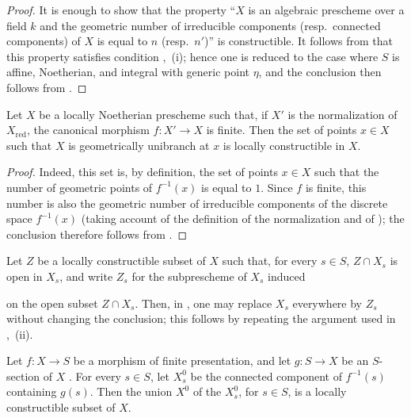 \begin{proof}
It is enough to show that the property ``$X$ is an algebraic prescheme over a field $k$ and the geometric number of irreducible components (resp.\ connected components) of $X$ is equal to $n$ (resp.\ $n'$)'' is constructible. It follows from  that this property satisfies condition ,~(i); hence one is reduced to the case where $S$ is affine, Noetherian, and integral with generic point $\eta$, and the conclusion then follows from .
\end{proof}

\begin{corollary}[9.7.10]
\label{IV.9.7.10}
Let $X$ be a locally Noetherian prescheme such that, if $X'$ is the normalization of $X_{\mathrm{red}}$, the canonical morphism $f:X'\to X$ is finite. Then the set of points $x\in X$ such that $X$ is geometrically unibranch at $x$ is locally constructible in $X$.
\end{corollary}

\begin{proof}
Indeed, this set is, by definition, the set of points $x\in X$ such that the number of geometric points of $f^{-1}(x)$ is equal to $1$. Since $f$ is finite, this number is also the geometric number of irreducible components of the discrete space $f^{-1}(x)$ (taking account of the definition of the normalization  and of ); the conclusion therefore follows from .
\end{proof}

\begin{remark}[9.7.11]
\label{IV.9.7.11}
Let $Z$ be a locally constructible subset of $X$ such that, for every $s\in S$, $Z\cap X_s$ is open in $X_s$, and write $Z_s$ for the subprescheme of $X_s$ induced


on the open subset $Z\cap X_s$. Then, in , one may replace $X_s$ everywhere by $Z_s$ without changing the conclusion; this follows by repeating the argument used in ,~(ii).
\end{remark}

\begin{proposition}[9.7.12]
\label{IV.9.7.12}
Let $f:X\to S$ be a morphism of finite presentation, and let $g:S\to X$ be an $S$-section of $X$ . For every $s\in S$, let $X_s^0$ be the connected component of $f^{-1}(s)$ containing $g(s)$. Then the union $X^0$ of the $X_s^0$, for $s\in S$, is a locally constructible subset of $X$.
\end{proposition}

